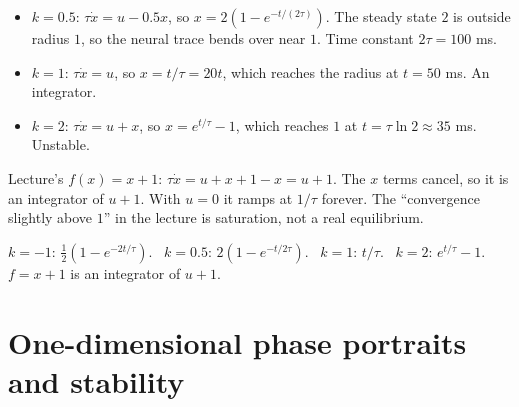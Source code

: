 \documentclass[11pt,letterpaper]{article}
\newcommand{\ans}[1]{\par\vspace{4pt}{\bfseries #1}\quad}
\begin{document}
\ans{Q2}
\begin{itemize}[leftmargin=1.2em]
\item $k = 0.5$: $\tau\dot x = u - 0.5x$, so $x = 2(1 - e^{-t/(2\tau)})$. The steady state $2$ is outside radius $1$, so the neural trace bends over near $1$. Time constant $2\tau = 100$ ms.
\item $k = 1$: $\tau\dot x = u$, so $x = t/\tau = 20t$, which reaches the radius at $t = 50$ ms. An integrator.
\item $k = 2$: $\tau\dot x = u + x$, so $x = e^{t/\tau} - 1$, which reaches $1$ at $t = \tau\ln 2 \approx 35$ ms. Unstable.
\end{itemize}
Lecture's $f(x) = x + 1$: $\tau\dot x = u + x + 1 - x = u + 1$. The $x$ terms cancel, so it is an integrator of $u + 1$. With $u = 0$ it ramps at $1/\tau$ forever. The ``convergence slightly above $1$'' in the lecture is saturation, not a real equilibrium.
\begin{center}
\end{center}
\begin{result}
$k = -1$: $\frac12(1 - e^{-2t/\tau})$. \ $k = 0.5$: $2(1 - e^{-t/2\tau})$. \ $k = 1$: $t/\tau$. \ $k = 2$: $e^{t/\tau} - 1$. \ $f = x + 1$ is an integrator of $u + 1$.
\end{result}

\section{One-dimensional phase portraits and stability}
\end{document}
